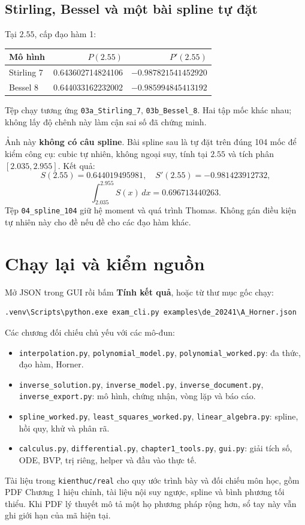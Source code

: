 \subsection{Stirling, Bessel và một bài spline tự đặt}
Tại $2.55$, cấp đạo hàm 1:
\begin{center}\small\begin{tabular}{lrr}\toprule
Mô hình&$P(2.55)$&$P'(2.55)$\\\midrule
Stirling 7&0.643602714824106&$-0.987821541452920$\\
Bessel 8&0.644033162232002&$-0.985994845413192$\\\bottomrule
\end{tabular}\end{center}
Tệp chạy tương ứng \texttt{03a\_Stirling\_7}, \texttt{03b\_Bessel\_8}. Hai tập mốc khác nhau; không lấy độ chênh này làm cận sai số đã chứng minh.

Ảnh này \textbf{không có câu spline}. Bài spline sau là tự đặt trên đúng 104 mốc để kiểm công cụ: cubic tự nhiên, không ngoại suy, tính tại $2.55$ và tích phân $[2.035,2.955]$. Kết quả:
\[
 S(2.55)=0.644019495981,\quad S'(2.55)=-0.981423912732,
\]
\[
 \int_{2.035}^{2.955}S(x)\,dx=0.696713440263.
\]
Tệp \texttt{04\_spline\_104} giữ hệ moment và quá trình Thomas. Không gán điều kiện tự nhiên này cho đề nếu đề cho các đạo hàm khác.

\section{Chạy lại và kiểm nguồn}
Mở JSON trong GUI rồi bấm \textbf{Tính kết quả}, hoặc từ thư mục gốc chạy:
\begin{verbatim}
.venv\Scripts\python.exe exam_cli.py examples\de_20241\A_Horner.json
\end{verbatim}
Các chương đối chiếu chủ yếu với các mô-đun:
\begin{itemize}
\item \texttt{interpolation.py}, \texttt{polynomial\_model.py}, \texttt{polynomial\_worked.py}: đa thức, đạo hàm, Horner.
\item \texttt{inverse\_solution.py}, \texttt{inverse\_model.py}, \texttt{inverse\_document.py}, \texttt{inverse\_export.py}: mô hình, chứng nhận, vòng lặp và báo cáo.
\item \texttt{spline\_worked.py}, \texttt{least\_squares\_worked.py}, \texttt{linear\_algebra.py}: spline, hồi quy, khử và phân rã.
\item \texttt{calculus.py}, \texttt{differential.py}, \texttt{chapter1\_tools.py}, \texttt{gui.py}: giải tích số, ODE, BVP, trị riêng, helper và đầu vào thực tế.
\end{itemize}
Tài liệu trong \texttt{kienthuc/real} cho quy ước trình bày và đối chiếu môn học, gồm PDF Chương 1 hiệu chỉnh, tài liệu nội suy ngược, spline và bình phương tối thiểu. Khi PDF lý thuyết mô tả một họ phương pháp rộng hơn, sổ tay này vẫn ghi giới hạn của mã hiện tại.

